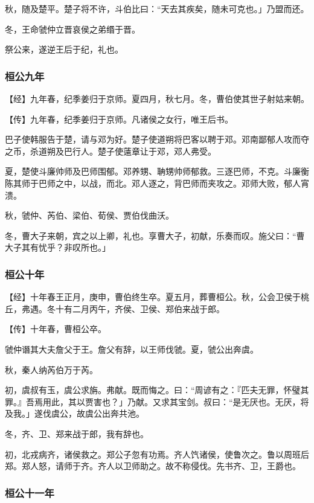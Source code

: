 \documentclass[]{article}
\begin{document}
秋，随及楚平。楚子将不许，斗伯比曰：``天去其疾矣，随未可克也。」乃盟而还。

冬，王命虢仲立晋哀侯之弟缗于晋。

祭公来，遂逆王后于纪，礼也。

\hypertarget{header-n253}{%
\subsubsection{桓公九年}\label{header-n253}}

【经】九年春，纪季姜归于京师。夏四月，秋七月。冬，曹伯使其世子射姑来朝。

【传】九年春，纪季姜归于京师。凡诸侯之女行，唯王后书。

巴子使韩服告于楚，请与邓为好。楚子使道朔将巴客以聘于邓。邓南鄙郁人攻而夺之币，杀道朔及巴行人。楚子使薳章让于邓，邓人弗受。

夏，楚使斗廉帅师及巴师围郁。邓养甥、聃甥帅师郁救。三逐巴师，不克。斗廉衡陈其师于巴师之中，以战，而北。邓人逐之，背巴师而夹攻之。邓师大败，郁人宵溃。

秋，虢仲、芮伯、梁伯、荀侯、贾伯伐曲沃。

冬，曹大子来朝，宾之以上卿，礼也。享曹大子，初献，乐奏而叹。施父曰：``曹大子其有忧乎？非叹所也。」

\hypertarget{header-n262}{%
\subsubsection{桓公十年}\label{header-n262}}

【经】十年春王正月，庚申，曹伯终生卒。夏五月，葬曹桓公。秋，公会卫侯于桃丘，弗遇。冬十有二月丙午，齐侯、卫侯、郑伯来战于郎。

【传】十年春，曹桓公卒。

虢仲谮其大夫詹父于王。詹父有辞，以王师伐虢。夏，虢公出奔虞。

秋，秦人纳芮伯万于芮。

初，虞叔有玉，虞公求旃。弗献。既而悔之。曰：``周谚有之：『匹夫无罪，怀璧其罪。』吾焉用此，其以贾害也？」乃献。又求其宝剑。叔曰：``是无厌也。无厌，将及我。」遂伐虞公，故虞公出奔共池。

冬，齐、卫、郑来战于郎，我有辞也。

初，北戎病齐，诸侯救之。郑公子忽有功焉。齐人饩诸侯，使鲁次之。鲁以周班后郑。郑人怒，请师于齐。齐人以卫师助之。故不称侵伐。先书齐、卫，王爵也。

\hypertarget{header-n272}{%
\subsubsection{桓公十一年}\label{header-n272}}
\end{document}
